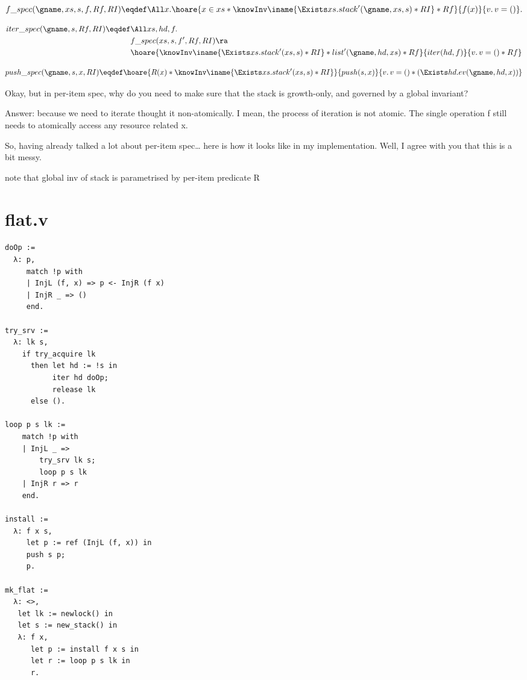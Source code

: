 \documentclass[11pt]{article}
\begin{document}
\[f\_spec (\gname, xs, s, f, Rf, RI) \eqdef
    \All x.
      \hoare{x \in xs * \knowInv\iname{\Exists xs. stack'(\gname, xs, s) * RI} * Rf}{f(x)}{ v.\, v = () }.\]

\[\begin{split}
  iter\_spec(\gname, s, Rf, RI) \eqdef
    &\All xs, hd, f.\\
      &f\_spec(xs, s, f', Rf, RI) \ra\\
      &\hoare{\knowInv\iname{\Exists xs. stack'(xs, s) * RI} * list'(\gname, hd, xs) * Rf}{iter(hd, f)}{ v.\, v = () * Rf}
  \end{split}\]

\[push\_spec (\gname, s, x, RI) \eqdef
  \hoare{R(x) * \knowInv\iname{\Exists xs. stack'(xs, s) * RI}}{push(s, x)}{v.\, v = () * (\Exists hd. ev(\gname, hd, x))}\]

Okay, but in per-item spec, why do you need to make sure that the stack is growth-only, and governed by a global invariant?

Answer: because we need to iterate thought it non-atomically. I mean, the process of iteration is not atomic. The single operation f still needs to atomically access any resource related x.

So, having already talked a lot about per-item spec… here is how it looks like in my implementation. Well, I agree with you that this is a bit messy. 

note that global inv of stack is parametrised by per-item predicate R

\section{flat.v}

\begin{verbatim}
doOp :=
  λ: p,
     match !p with
     | InjL (f, x) => p <- InjR (f x)
     | InjR _ => ()
     end.

try_srv :=
  λ: lk s,
    if try_acquire lk
      then let hd := !s in
           iter hd doOp;
           release lk
      else ().

loop p s lk :=
    match !p with
    | InjL _ =>
        try_srv lk s;
        loop p s lk
    | InjR r => r
    end.

install :=
  λ: f x s,
     let p := ref (InjL (f, x)) in
     push s p;
     p.

mk_flat :=
  λ: <>,
   let lk := newlock() in
   let s := new_stack() in
   λ: f x,
      let p := install f x s in
      let r := loop p s lk in
      r.
\end{verbatim}
\end{document}
